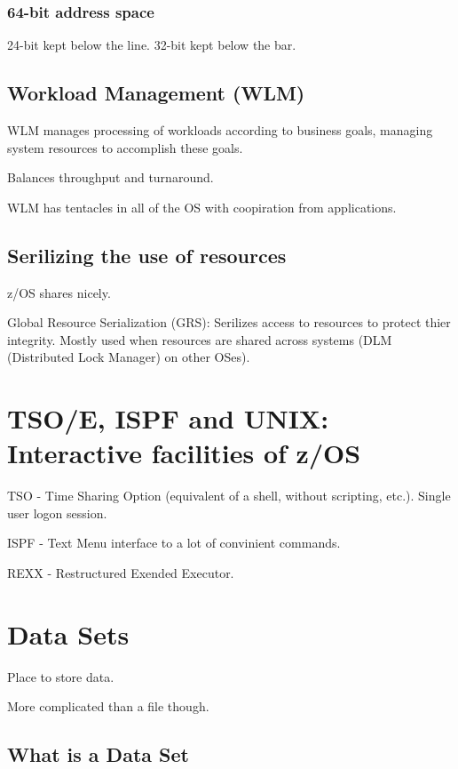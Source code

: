 \documentclass{report}
\begin{document}
\subsubsection{64-bit address space}

24-bit kept below the line.
32-bit kept below the bar.



\subsection{Workload Management (WLM)}

WLM manages processing of workloads according to business goals, managing system resources to accomplish these goals.

Balances throughput and turnaround.

WLM has tentacles in all of the OS with coopiration from applications.

\subsection{Serilizing the use of resources}

z/OS shares nicely.

Global Resource Serialization (GRS): Serilizes access to resources to protect thier integrity. Mostly used when resources are shared across systems (DLM (Distributed Lock Manager) on other OSes).







\section{TSO/E, ISPF and UNIX: Interactive facilities of z/OS}
TSO - Time Sharing Option (equivalent of a shell, without scripting, etc.). Single user logon session.

ISPF - Text Menu interface to a lot of convinient commands.

REXX - Restructured Exended Executor.

\section{Data Sets}

Place to store data.

More complicated than a file though.

\subsection{What is a Data Set}
\end{document}
